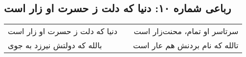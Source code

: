 \begin{center}
\section*{رباعی شماره ۱۰: دنیا که دلت ز حسرت او زار است}
\label{sec:010}
\begin{longtable}{l p{0.5cm} r}
دنیا که دلت ز حسرت او زار است
&&
سرتاسر او تمام، محنت‌زار است
\\
بالله که دولتش نیرزد به جوی
&&
تالله که نام بردنش هم عار است
\\
\end{longtable}
\end{center}
